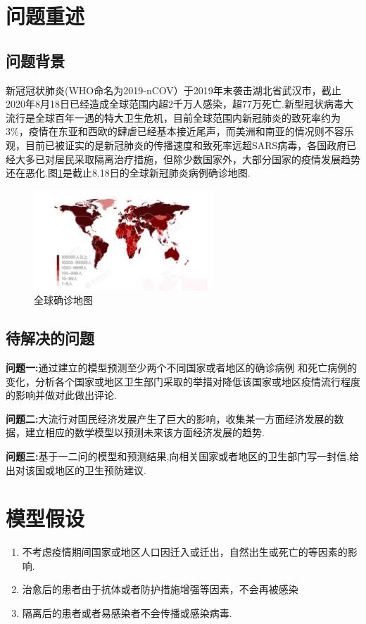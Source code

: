 \documentclass{whutmod}
\begin{document}
\tableofcontents
\newpage

\section{问题重述}
\subsection{问题背景}
新冠冠状肺炎(WHO命名为2019-nCOV）于2019年末袭击湖北省武汉市，截止2020年8月18日已经造成全球范围内超2千万人感染，超77万死亡.新型冠状病毒大流行是全球百年一遇的特大卫生危机，目前全球范围内新冠肺炎的致死率约为3\%，疫情在东亚和西欧的肆虐已经基本接近尾声，而美洲和南亚的情况则不容乐观，目前已被证实的是新冠肺炎的传播速度和致死率远超SARS病毒，各国政府已经大多已对居民采取隔离治疗措施，但除少数国家外，大部分国家的疫情发展趋势还在恶化.图\ref{globalmap}是截止8.18日的全球新冠肺炎病例确诊地图.

\begin{figure}[!htbp]
	\centering
	\includegraphics[width=0.6\textwidth]{globalmap.png}
	\caption{全球确诊地图}
	\label{globalmap}
\end{figure} 


\subsection{待解决的问题}
\textbf{问题一:}通过建立的模型预测至少两个不同国家或者地区的确诊病例
和死亡病例的变化，分析各个国家或地区卫生部门采取的举措对降低该国家或地区疫情流行程度的影响并做对此做出评论.

\textbf{问题二:}大流行对国民经济发展产生了巨大的影响，收集某一方面经济发展的数据，建立相应的数学模型以预测未来该方面经济发展的趋势.

\textbf{问题三:}基于一二问的模型和预测结果,向相关国家或者地区的卫生部门写一封信,给出对该国或地区的卫生预防建议.


\section{模型假设}
\begin{enumerate}
	\item 不考虑疫情期间国家或地区人口因迁入或迁出，自然出生或死亡的等因素的影响.
	\item 治愈后的患者由于抗体或者防护措施增强等因素，不会再被感染
     \item 隔离后的患者或者易感染者不会传播或感染病毒.

\end{enumerate}
\end{document}
